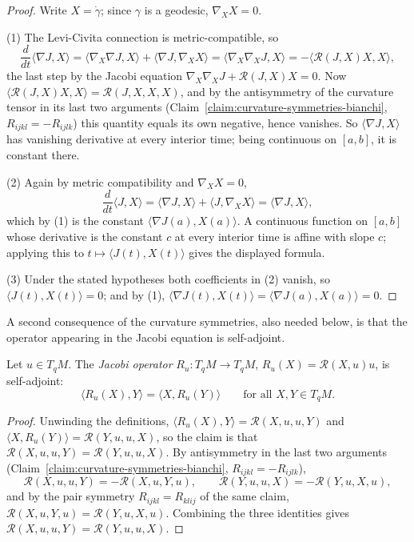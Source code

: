 \begin{proof}
\leanok
Write $X=\dot\gamma$; since $\gamma$ is a geodesic, $\nabla_XX=0$.

(1) The Levi-Civita connection is metric-compatible, so
$$\frac{d}{dt}\langle\nabla J,X\rangle
=\langle\nabla_X\nabla J,X\rangle+\langle\nabla J,\nabla_XX\rangle
=\langle\nabla_X\nabla_XJ,X\rangle
=-\langle{\mathcal R}(J,X)X,X\rangle,$$
the last step by the Jacobi equation
$\nabla_X\nabla_XJ+{\mathcal R}(J,X)X=0$. Now
$\langle{\mathcal R}(J,X)X,X\rangle={\mathcal R}(J,X,X,X)$, and by the
antisymmetry of the curvature tensor in its last two arguments
(Claim~\ref{claim:curvature-symmetries-bianchi}, $R_{ijkl}=-R_{ijlk}$)
this quantity equals its own negative, hence vanishes. So
$\langle\nabla J,X\rangle$ has vanishing derivative at every interior
time; being continuous on $[a,b]$, it is constant there.

(2) Again by metric compatibility and $\nabla_XX=0$,
$$\frac{d}{dt}\langle J,X\rangle
=\langle\nabla J,X\rangle+\langle J,\nabla_XX\rangle
=\langle\nabla J,X\rangle,$$
which by (1) is the constant $\langle\nabla J(a),X(a)\rangle$. A
continuous function on $[a,b]$ whose derivative is the constant $c$ at
every interior time is affine with slope $c$; applying this to
$t\mapsto\langle J(t),X(t)\rangle$ gives the displayed formula.

(3) Under the stated hypotheses both coefficients in (2) vanish, so
$\langle J(t),X(t)\rangle=0$; and by (1),
$\langle\nabla J(t),X(t)\rangle=\langle\nabla J(a),X(a)\rangle=0$.
\end{proof}

A second consequence of the curvature symmetries, also needed below, is
that the operator appearing in the Jacobi equation is self-adjoint.

\begin{lemma}
\label{lem:jacobi-operator-symmetric}
\leanok
Let $u\in T_qM$. The {\sl Jacobi operator} $R_u\colon T_qM\to T_qM$,
$R_u(X)={\mathcal R}(X,u)u$, is self-adjoint:
$$\langle R_u(X),Y\rangle=\langle X,R_u(Y)\rangle
\qquad\text{for all }X,Y\in T_qM.$$
\end{lemma}

\begin{proof}
\leanok
Unwinding the definitions, $\langle R_u(X),Y\rangle={\mathcal
R}(X,u,u,Y)$ and $\langle X,R_u(Y)\rangle={\mathcal R}(Y,u,u,X)$, so
the claim is that ${\mathcal R}(X,u,u,Y)={\mathcal R}(Y,u,u,X)$. By
antisymmetry in the last two arguments
(Claim~\ref{claim:curvature-symmetries-bianchi},
$R_{ijkl}=-R_{ijlk}$),
$${\mathcal R}(X,u,u,Y)=-{\mathcal R}(X,u,Y,u),\qquad
{\mathcal R}(Y,u,u,X)=-{\mathcal R}(Y,u,X,u),$$
and by the pair symmetry $R_{ijkl}=R_{klij}$ of the same claim,
${\mathcal R}(X,u,Y,u)={\mathcal R}(Y,u,X,u)$. Combining the three
identities gives ${\mathcal R}(X,u,u,Y)={\mathcal R}(Y,u,u,X)$.
\end{proof}

